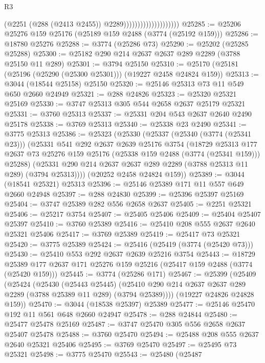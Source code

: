 \begin{lexlean}{R3}
\begin{coremodule}
                                          (@2251 (@288 (@2413 @2455)) @2289))))))))))))))))))))
@25285 := @25206 @25276 @159 @25176 (@25189 @159 @2488 (@3774 (@25192 @159)))
@25286 := @18780 @25276
@25288 := @3774 (@25286 @73)
@25290 := @25202 (@25285 @25288)
@25300 := @25182 @290 @214 @2637 @2637 @289 @2289 (@3788 @25150 @11 @289)
@25301 := @3794 @25150
@25310 := @25170 (@25181 (@25196 (@25290 (@25300 @25301))) (@19227 @2458 @24824 @159))
@25313 := @3044 (@18544 @25158) @25150
@25320 := @25146 @25313 @73 @11 @549 @650 @2660 @24949
@25321 := @288 @24826
@25323 := @25320 @25321 @25169
@25330 := @3747 @25313 @305 @544 @2658 @2637 @25179 @25321
@25331 := @3760 @25313
@25337 := @25331 @204 @543 @2637 @2640 @2490 @25178
@25338 := @3769 @25313
@25340 := @25338 @23 @2490
@25341 := @3775 @25313
@25386 := @25323
    (@25330
      (@25337
        (@25340 (@3774 (@25341 @23)))
        (@25331
          @541
          @292
          @2637
          @2639
          @25176
          @3754
          (@18729
            @25313
            @177
            @2637
            @73
            @25276
            @159
            @25176
            (@25338 @159 @2488 (@3774 (@25341 @159)))
            @25288)
          (@25331 @290 @214 @2637 @2637 @289 @2289 (@3788 @25313 @11 @289) (@3794 @25313))))
      (@20252 @2458 @24824 @159))
@25389 := @3044 (@18541 @25321) @25313
@25396 := @25146 @25389 @171 @11 @557 @649 @2660 @24948
@25397 := @288 @24830
@25399 := @25396 @25397 @25169
@25404 := @3747 @25389 @282 @556 @2658 @2637
@25405 := @2251 @25321
@25406 := @25217 @3754
@25407 := @25405 @25406
@25409 := @25404 @25407 @25397
@25410 := @3760 @25389
@25416 := @25410 @208 @555 @2637 @2640 @25321 @25406
@25417 := @3769 @25389
@25419 := @25417 @73 @25321
@25420 := @3775 @25389
@25424 := @25416 (@25419 (@3774 (@25420 @73)))
@25430 := @25410 @553 @292 @2637 @2639 @25216 @3754
@25443 := @18729 @25389 @177 @2637 @171 @25276 @159 @25216 (@25417 @159 @2488 (@3774 (@25420 @159)))
@25445 := @3774 (@25286 @171)
@25467 := @25399
    (@25409
      (@25424
        (@25430
          (@25443 @25445)
          (@25410 @290 @214 @2637 @2637 @289 @2289 (@3788 @25389 @11 @289) (@3794 @25389))))
      (@19227 @24826 @24828 @159))
@25470 := @3044 (@18538 @25397) @25389
@25477 := @25146 @25470 @192 @11 @561 @648 @2660 @24947
@25478 := @288 @24844
@25480 := @25477 @25478 @25169
@25487 := @3747 @25470 @305 @556 @2658 @2637 @25407 @25478
@25488 := @3760 @25470
@25494 := @25488 @208 @555 @2637 @2640 @25321 @25406
@25495 := @3769 @25470
@25497 := @25495 @73 @25321
@25498 := @3775 @25470
@25543 := @25480
    (@25487

\end{coremodule}
\end{lexlean}
